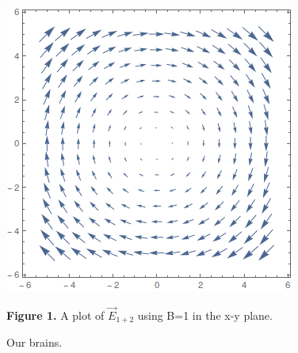 \documentclass[11pt]{article}
\begin{document}
\begin{center}
	\includegraphics[]{E1plus2.png}
	
	{\footnotesize \textbf{Figure 1.} A plot of $\vec{E}_{1+2}$ using B=1 in the x-y plane.}
\end{center}

\begin{thebibliography}{9}
	 Our brains.
\end{thebibliography}

\end{document}
